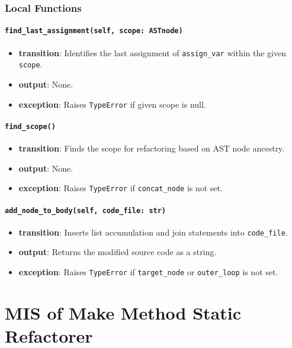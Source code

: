 \documentclass[12pt, titlepage]{article}
\begin{document}
\subsubsection{Local Functions}
\paragraph{\texttt{find\_last\_assignment(self, scope: ASTnode)}}
\begin{itemize}
  \item \textbf{transition}: Identifies the last assignment of \texttt{assign\_var} within the given \texttt{scope}.
  \item \textbf{output}: None.
  \item \textbf{exception}: Raises \texttt{TypeError} if given scope is null.
\end{itemize}

\paragraph{\texttt{find\_scope()}}
\begin{itemize}
  \item \textbf{transition}: Finds the scope for refactoring based on AST node ancestry.
  \item \textbf{output}: None.
  \item \textbf{exception}: Raises \texttt{TypeError} if \texttt{concat\_node} is not set.
\end{itemize}

\paragraph{\texttt{add\_node\_to\_body(self, code\_file: str)}}
\begin{itemize}
  \item \textbf{transition}: Inserts list accumulation and join statements into \texttt{code\_file}.
  \item \textbf{output}: Returns the modified source code as a string.
  \item \textbf{exception}: Raises \texttt{TypeError} if \texttt{target\_node} or \texttt{outer\_loop} is not set.
\end{itemize}
  
\newpage

\section{MIS of Make Method Static Refactorer} \label{mis:MakeStatic}
\end{document}
